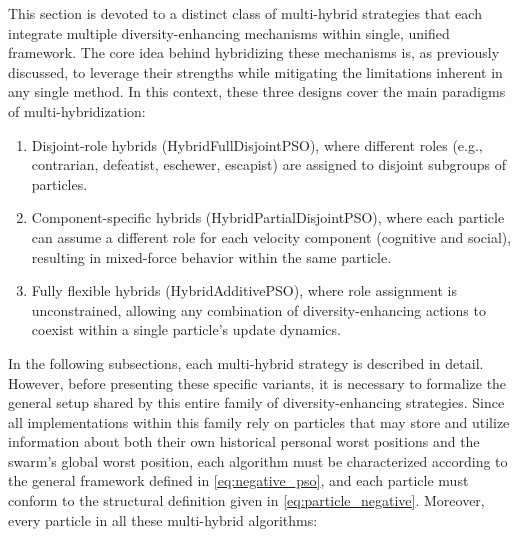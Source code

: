 {This section is devoted to a distinct class of multi-hybrid strategies that each integrate multiple diversity\--enhancing mechanisms within single, unified framework. The core idea behind hybridizing these mechanisms is, as previously discussed, to leverage their strengths while mitigating the limitations inherent in any single method. In this context, these three designs cover the main paradigms of multi-hybridization:
\begin{enumerate}
    \item Disjoint-role hybrids (HybridFullDisjointPSO), where different roles (e.g., contrarian, defeatist, eschewer, escapist) are assigned to disjoint subgroups of particles.
    \item Component-specific hybrids (HybridPartialDisjointPSO), where each particle can assume a different role for each velocity component (cognitive and social), resulting in mixed-force behavior within the same particle.
    \item Fully flexible hybrids (HybridAdditivePSO), where role assignment is unconstrained, allowing any combination of diversity-enhancing actions to coexist within a single particle’s update dynamics.
\end{enumerate}
In the following subsections, each multi-hybrid strategy is described in detail. However, before presenting these specific variants, it is necessary to formalize the general setup shared by this entire family of diversity-enhancing strategies.
Since all implementations within this family rely on particles that may store and utilize information about both their own historical personal worst positions and the swarm's global worst position, each algorithm must be characterized according to the general framework defined in \eqref{eq:negative_pso}, and each particle must conform to the structural definition given in \eqref{eq:particle_negative}. Moreover, every particle in all these multi-hybrid algorithms:
}
